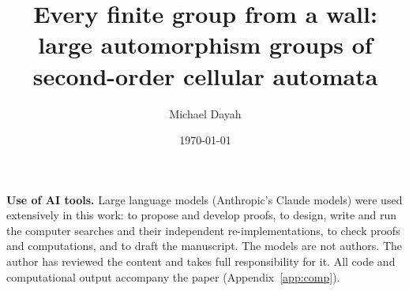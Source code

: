 \documentclass[11pt]{amsart}
\title[Every finite group from a wall]{Every finite group from a wall: large automorphism groups of second-order cellular automata}
\author{Michael Dayah}
\date{\today}
\theoremstyle{definition}
\theoremstyle{remark}
\begin{document}


\maketitle











\appendix


\medskip
\noindent\textbf{Use of AI tools.} Large language models (Anthropic's Claude models) were used extensively in this work: to propose and develop proofs, to design, write and run the computer searches and their independent re-implementations, to check proofs and computations, and to draft the manuscript. The models are not authors. The author has reviewed the content and takes full responsibility for it. All code and computational output accompany the paper (Appendix~\ref{app:comp}).


\end{document}
